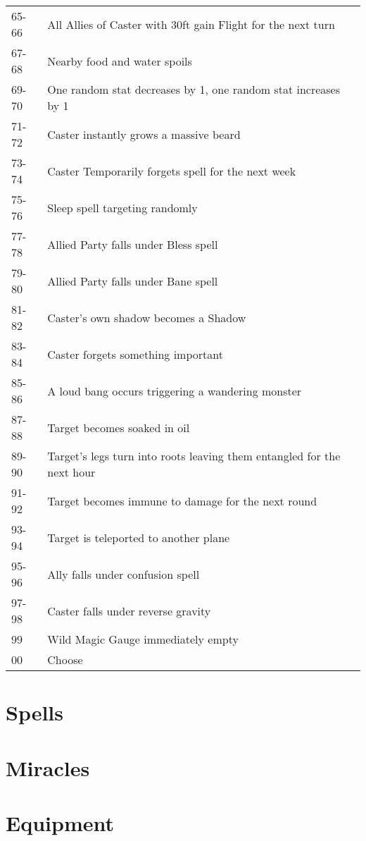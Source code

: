 \documentclass[18pt]{article}
\begin{document}
\begin{table}[H]
\begin{center}
\begin{tabularx}{\textwidth}{s 
>{\arraybackslash{}\hsize}X}
65-66 & All Allies of Caster with 30ft gain Flight for the next turn \\
67-68 & Nearby food and water spoils\\
69-70 & One random stat decreases by 1, one random stat increases by 1\\
71-72 & Caster instantly grows a massive beard\\
73-74 & Caster Temporarily forgets spell for the next week\\
75-76 & Sleep spell targeting randomly\\
77-78 & Allied Party falls under Bless spell\\
79-80 & Allied Party falls under Bane spell\\
81-82 & Caster's own shadow becomes a Shadow \\
83-84 & Caster forgets something important\\
85-86 & A loud bang occurs triggering a wandering monster \\
87-88 & Target becomes soaked in oil\\
89-90 & Target's legs turn into roots leaving them entangled for the next hour\\
91-92 & Target becomes immune to damage for the next round\\
93-94 & Target is teleported to another plane\\
95-96 & Ally falls under confusion spell\\
97-98 & Caster falls under reverse gravity\\
99 & Wild Magic Gauge immediately empty \\
00 & Choose \\
\end{tabularx}
\end{center}
\label{table:WildMagic}
\end{table}

\begin{multicols}{2}
\section*{Spells}%
\section*{Miracles}%
\end{multicols}
\section*{Equipment}%
\label{section:Equipment}
\end{document}
